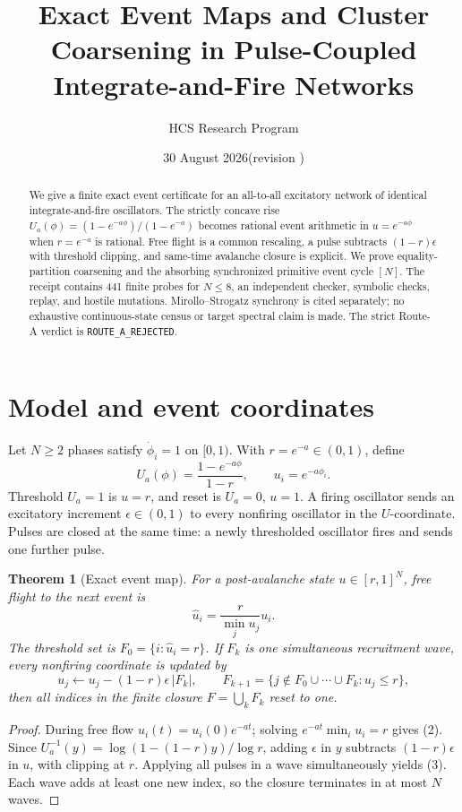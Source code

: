 \documentclass[10pt]{article}
\title{Exact Event Maps and Cluster Coarsening in Pulse-Coupled Integrate-and-Fire Networks}
\author{HCS Research Program}
\date{30 August 2026\quad (revision \CRevisionRound)}
\newtheorem{theorem}{Theorem}
\begin{document}
\maketitle
\begin{abstract}
We give a finite exact event certificate for an all-to-all excitatory network
of identical integrate-and-fire oscillators.  The strictly concave rise
\(U_a(\phi)=(1-e^{-a\phi})/(1-e^{-a})\) becomes rational event arithmetic in
\(u=e^{-a\phi}\) when \(r=e^{-a}\) is rational.  Free flight is a common
rescaling, a pulse subtracts \((1-r)\epsilon\) with threshold clipping, and
same-time avalanche closure is explicit.  We prove equality-partition
coarsening and the absorbing synchronized primitive event cycle \([N]\).
The receipt contains 441 finite probes for \(N\leq8\), an independent checker,
symbolic checks, replay, and hostile mutations.  Mirollo--Strogatz synchrony
is cited separately; no exhaustive continuous-state census or target spectral
claim is made.  The strict Route-A verdict is \texttt{ROUTE\_A\_REJECTED}.
\end{abstract}

\section{Model and event coordinates}
Let \(N\ge2\) phases satisfy \(\dot\phi_i=1\) on \([0,1)\).  With
\(r=e^{-a}\in(0,1)\), define
\begin{equation}
 U_a(\phi)=\frac{1-e^{-a\phi}}{1-r},\qquad u_i=e^{-a\phi_i}.
 \tag{1}
\end{equation}
Threshold \(U_a=1\) is \(u=r\), and reset is \(U_a=0\), \(u=1\).  A firing
oscillator sends an excitatory increment \(\epsilon\in(0,1)\) to every
nonfiring oscillator in the \(U\)-coordinate.  Pulses are closed at the same
time: a newly thresholded oscillator fires and sends one further pulse.

\begin{theorem}[Exact event map]
For a post-avalanche state \(u\in[r,1]^N\), free flight to the next event is
\begin{equation}
 \widehat u_i=\frac{r}{\min_j u_j}u_i. \tag{2}
\end{equation}
The threshold set is \(F_0=\{i:\widehat u_i=r\}\).  If \(F_k\) is one simultaneous
recruitment wave, every nonfiring coordinate is updated by
\begin{equation}
 u_j\leftarrow u_j-(1-r)\epsilon\,|F_k|,\qquad
 F_{k+1}=\{j\notin F_0\cup\cdots\cup F_k:u_j\le r\}, \tag{3}
\end{equation}
then all indices in the finite closure \(F=\bigcup_kF_k\) reset to one.
\end{theorem}
\begin{proof}
During free flow \(u_i(t)=u_i(0)e^{-at}\); solving
\(e^{-at}\min_i u_i=r\) gives (2).  Since
\(U_a^{-1}(y)=\log(1-(1-r)y)/\log r\), adding \(\epsilon\) in \(y\) subtracts
\((1-r)\epsilon\) in \(u\), with clipping at \(r\).  Applying all pulses in a
wave simultaneously yields (3).  Each wave adds at least one new index, so
the closure terminates in at most \(N\) waves.  \end{proof}
\end{document}
